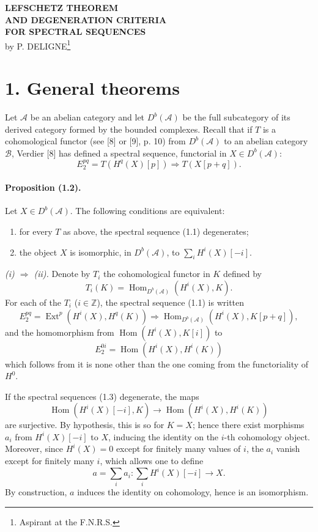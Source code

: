 \documentclass[10pt]{article}
\newcommand{\Acal}{\mathcal A}
\newcommand{\Bcal}{\mathcal B}
\newcommand{\Z}{\mathbb Z}
\newcommand{\Db}{D^b}
\newcommand{\Hom}{\operatorname{Hom}}
\newcommand{\Ext}{\operatorname{Ext}}
\begin{document}
\begin{center}
{\Large\bfseries LEFSCHETZ THEOREM\\
AND DEGENERATION CRITERIA\\
FOR SPECTRAL SEQUENCES}\\[0.6em]
by P. DELIGNE\footnote{Aspirant at the F.N.R.S.}
\end{center}

\section*{1. General theorems}

Let $\Acal$ be an abelian category and let $\Db(\Acal)$ be the full subcategory of its derived category formed by the bounded complexes. Recall that if $T$ is a cohomological functor (see [8] or [9], p. 10) from $\Db(\Acal)$ to an abelian category $\Bcal$, Verdier [8] has defined a spectral sequence, functorial in $X\in\Db(\Acal)$:
\[
\tag{1.1}
E_2^{pq}=T(H^q(X)[p])\Longrightarrow T(X[p+q]).
\]

\paragraph{Proposition (1.2).} Let $X\in\Db(\Acal)$. The following conditions are equivalent:
\begin{enumerate}[label=(\roman*)]
\item for every $T$ as above, the spectral sequence (1.1) degenerates;
\item the object $X$ is isomorphic, in $\Db(\Acal)$, to $\sum_i H^i(X)[-i]$.
\end{enumerate}

\emph{(i) $\Rightarrow$ (ii).} Denote by $T_i$ the cohomological functor in $K$ defined by
\[
T_i(K)=\Hom_{\Db(\Acal)}(H^i(X),K).
\]
For each of the $T_i$ ($i\in\Z$), the spectral sequence (1.1) is written
\[
\tag{1.3}
E_2^{pq}=\Ext^p(H^i(X),H^q(K))\Longrightarrow
\Hom_{\Db(\Acal)}(H^i(X),K[p+q]),
\]
and the homomorphism from $\Hom(H^i(X),K[i])$ to
\[
E_2^{0i}=\Hom(H^i(X),H^i(K))
\]
which follows from it is none other than the one coming from the functoriality of $H^0$.

If the spectral sequences (1.3) degenerate, the maps
\[
\Hom(H^i(X)[-i],K)\longrightarrow \Hom(H^i(X),H^i(K))
\]
are surjective. By hypothesis, this is so for $K=X$; hence there exist morphisms $a_i$ from $H^i(X)[-i]$ to $X$, inducing the identity on the $i$-th cohomology object. Moreover, since $H^i(X)=0$ except for finitely many values of $i$, the $a_i$ vanish except for finitely many $i$, which allows one to define
\[
a=\sum_i a_i:\sum_i H^i(X)[-i]\longrightarrow X.
\]
By construction, $a$ induces the identity on cohomology, hence is an isomorphism.
\end{document}
